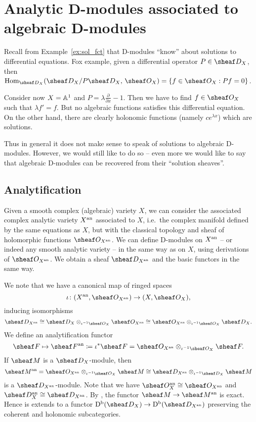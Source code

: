 \documentclass[number-in-sections,a4paper]{notes}
\begin{document}
\section{Analytic D-modules associated to algebraic D-modules}

Recall from Example~\ref{ex:sol_fct} that D-modules \enquote{know} about solutions to differential equations.
Fox example, given a differential operator $P \in \sD_X$, then $ \Hom_{\sD_X}(\sD_X/P\sD_X,\, \sO_X) = \{ f \in \sO_X : Pf = 0 \}$.

Consider now $X = \mathbb A^{1}_{}$ and $P = \lambda\frac{\partial}{\partial x} -1$.
Then we have to find $f \in \sO_X$ such that $\lambda f' = f$.
But no algebraic functions satisfies this differential equation.
On the other hand, there are clearly holonomic functions (namely $ce^{\lambda x}$) which are solutions.

Thus in general it does not make sense to speak of solutions to algebraic D-modules.
However, we would still like to do so -- even more we would like to say that algebraic D-modules can be recovered from their \enquote{solution sheaves}.

\subsection{Analytification}

Given a smooth complex (algebraic) variety $X$, we can consider the associated complex analytic variety $X^{\mathrm{an}}$ associated to $X$, i.e.~the complex manifold defined by the same equations as $X$, but with the classical topology and sheaf of holomorphic functions $\sO_{X^\an}$.
We can define D-modules on $X^{\mathrm{an}}$ -- or indeed any smooth analytic variety -- in the same way as on $X$, using derivations of $\sO_{X^\an}$.
We obtain a sheaf $\sD_{X^\an}$ and the basic functors in the same way.

We note that we have a canonical map of ringed spaces
\[
    \iota\colon (X^\an, \sO_{X^{\an}}) \to (X, \sO_X),
\]
inducing isomorphisms
\[
    \sD_{X^\an} \cong \sD_{X} \otimes_{\iota^{-1}\sO_X} \sO_{X^\an} \cong \sO_{X^\an} \otimes_{\iota^{-1}\sO_X} \sD_{X}.
\]
We define an analytification functor
\[
    \sheaf F \mapsto \sheaf F^\an \coloneqq \iota^*\sheaf F = \sO_{X^\an} \otimes_{\iota^{-1}\sO_{X}} \sheaf F.
\]
If $\sheaf M$ is a $\sD_X$-module, then
\[
    \sheaf M^\an = 
    \sO_{X^\an} \otimes_{\iota^{-1}\sO_{X}} \sheaf M \cong
    \sD_{X^\an} \otimes_{\iota^{-1}\sD_{X}} \sheaf M
\]
is a $\sD_{X^\an}$-module.
Note that we have $\sO_X^\an \cong \sO_{X^\an}$ and $\sD_X^\an \cong \sD_{X^\an}$.
By \cite[Proposition~10]{Serre:GAGA}, the functor $\sheaf M \to \sheaf M^\an$ is exact.
Hence is extends to a functor $\catDbDMod{X} \to \catDbDMod{X^\an}$ preserving the coherent and holonomic subcategories.
\end{document}
